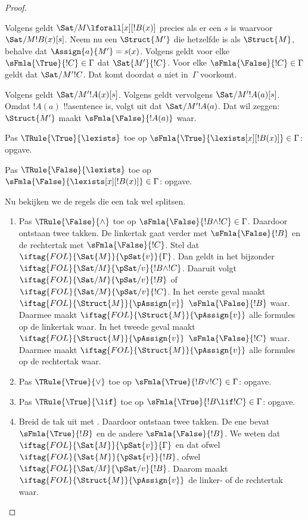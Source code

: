 \documentclass[../../../include/open-logic-section]{subfiles}
\begin{document}
\begin{proof}
\begin{enumerate}
{  Volgens  geldt
  $\Sat/{M}{\lforall[x][!B(x)]}$ precies als er een $s$ is waarvoor
  $\Sat/{M}{!B(x)}[s]$. Neem nu een $\Struct{M'}$ die hetzelfde is als
  $\Struct{M}$, behalve dat $\Assign{a}{M'} = s(x)$. Volgens
   geldt voor elke
  $\sFmla{\True}{!C} \in \Gamma$ dat $\Sat{M'}{!C}$. Voor elke
  $\sFmla{\False}{!C} \in \Gamma$ geldt dat $\Sat/{M'}{!C}$. Dat komt
  doordat $a$ niet in~$\Gamma$ voorkomt.

  Volgens  geldt
  $\Sat/{M'}{!A(x)}[s]$. Volgens
   geldt vervolgens
  $\Sat/{M'}{!A(a)}[s]$. Omdat $!A(a)$ !!a{sentence} is, volgt uit
   dat
  $\Sat/{M'}{!A(a)}$. Dat wil zeggen: $\Struct{M'}$ maakt
  $\sFmla{\False}{!A(a)}$ waar.
\item Pas $\TRule{\True}{\lexists}$ toe op
  $\sFmla{\True}{\lexists[x][!B(x)]} \in \Gamma$: opgave.
\item Pas $\TRule{\False}{\lexists}$ toe op
  $\sFmla{\False}{\lexists[x][!B(x)]} \in \Gamma$: opgave.}{}
\end{enumerate}
Nu bekijken we de regels die een tak wel splitsen.
\begin{enumerate}
\item Pas $\TRule{\False}{\land}$ toe op
  $\sFmla{\False}{!B \land !C} \in \Gamma$. Daardoor ontstaan twee
  takken. De linkertak gaat verder met $\sFmla{\False}{!B}$ en de
  rechtertak met $\sFmla{\False}{!C}$. Stel dat
  $\iftag{FOL}{\Sat{M}}{\pSat{v}}{\Gamma}$. Dan geldt in het bijzonder
  $\iftag{FOL}{\Sat/{M}}{\pSat/{v}}{!B \land !C}$. Daaruit volgt
  $\iftag{FOL}{\Sat/{M}}{\pSat/{v}}{!B}$ of
  $\iftag{FOL}{\Sat/{M}}{\pSat/{v}}{!C}$. In het eerste geval maakt
  $\iftag{FOL}{\Struct{M}}{\pAssign{v}}$
  $\sFmla{\False}{!B}$ waar. Daarmee maakt
  $\iftag{FOL}{\Struct{M}}{\pAssign{v}}$ alle formules op de linkertak
  waar. In het tweede geval maakt
  $\iftag{FOL}{\Struct{M}}{\pAssign{v}}$
  $\sFmla{\False}{!C}$ waar. Daarmee maakt
  $\iftag{FOL}{\Struct{M}}{\pAssign{v}}$ alle formules op de
  rechtertak waar.
\item Pas $\TRule{\True}{\lor}$ toe op
  $\sFmla{\True}{!B \lor !C} \in \Gamma$: opgave.
\item Pas $\TRule{\True}{\lif}$ toe op
  $\sFmla{\True}{!B \lif !C} \in \Gamma$: opgave.
\item Breid de tak uit met \Cut. Daardoor ontstaan twee takken. De ene
  bevat $\sFmla{\True}{!B}$ en de andere
  $\sFmla{\False}{!B}$. We weten dat
  $\iftag{FOL}{\Sat{M}}{\pSat{v}}{\Gamma}$ en dat ofwel
  $\iftag{FOL}{\Sat{M}}{\pSat{v}}{!B}$, ofwel
  $\iftag{FOL}{\Sat/{M}}{\pSat/{v}}{!B}$. Daarom maakt
  $\iftag{FOL}{\Struct{M}}{\pAssign{v}}$ de linker- of de rechtertak
  waar.
\end{enumerate}
\end{proof}
\end{document}
